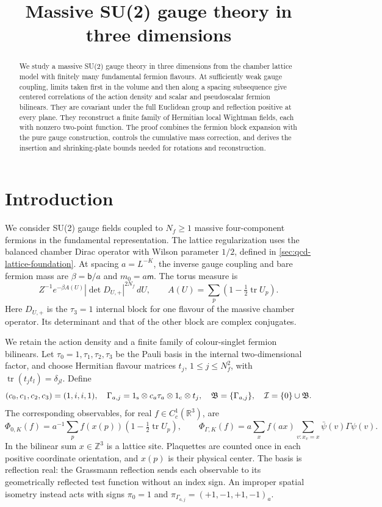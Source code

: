 \documentclass[11pt,letterpaper,reqno]{amsart}
\title[Massive SU(2) gauge theory]{Massive SU(2) gauge theory in three dimensions}
\date{}
\theoremstyle{definition}
\theoremstyle{remark}
\begin{document}
\begin{abstract}
We study a massive SU(2) gauge theory in three dimensions from
the chamber lattice model with finitely many fundamental fermion
flavours. At sufficiently weak gauge coupling, limits taken first
in the volume and then along a spacing subsequence give centered
correlations of the action density and scalar and pseudoscalar
fermion bilinears. They are covariant under the full Euclidean
group and reflection positive at every plane. They reconstruct
a finite family of Hermitian local Wightman fields, each with
nonzero two-point function. The proof combines the fermion block
expansion with the pure gauge construction, controls the cumulative
mass correction, and derives the insertion and shrinking-plate
bounds needed for rotations and reconstruction.
\end{abstract}
\maketitle
\tableofcontents
\section{Introduction}\label{sec:introduction}

We consider SU(2) gauge fields coupled to $N_f\ge1$ massive
four-component fermions in the fundamental representation.
The lattice regularization uses the balanced chamber Dirac
operator with Wilson parameter $1/2$, defined in
\cref{sec:qcd-lattice-foundation}. At spacing $a=L^{-K}$,
the inverse gauge coupling and bare fermion mass are
$\beta=\mathsf b/a$ and $m_0=a\mathsf m$. The torus measure is
\[
 Z^{-1}e^{-\beta A(U)}|\det D_{U,+}|^{2N_f}\,dU,
 \qquad A(U)=\sum_p(1-\tfrac12\operatorname{tr}U_p).
\]
Here $D_{U,+}$ is the $\tau_3=1$ internal block for one flavour
of the massive chamber operator. Its determinant and that
of the other block are complex conjugates.

We retain the action density and a finite family of colour-singlet
fermion bilinears. Let $\tau_0=1,\tau_1,\tau_2,\tau_3$
be the Pauli basis in the internal two-dimensional factor,
and choose Hermitian flavour matrices $t_j$, $1\le j\le N_f^2$,
with $\operatorname{tr}(t_jt_l)=\delta_{jl}$. Define
\[
 (c_0,c_1,c_2,c_3)=(1,i,i,1),\quad
 \Gamma_{a,j}=1_{\rm s}\otimes c_a\tau_a\otimes1_{\rm c}\otimes t_j,
 \quad \mathfrak B=\{\Gamma_{a,j}\},\quad
 \mathcal I=\{0\}\cup\mathfrak B.
\]
The corresponding observables, for real $f\in C_c^1(\mathbb R^3)$, are
\begin{equation}\label{eq:qcd-physical-observables}
 \Phi_{0,K}(f)=a^{-1}\sum_p f(x(p))
                (1-\tfrac12\operatorname{tr}U_p),\qquad
 \Phi_{\Gamma,K}(f)=a\sum_x f(ax)
                      \sum_{v:x_v=x}\bar\psi(v)\Gamma\psi(v).
\end{equation}
In the bilinear sum $x\in\mathbb Z^3$ is a lattice site.
Plaquettes are counted once in each positive coordinate orientation,
and $x(p)$ is their physical center. The basis is reflection real:
the Grassmann reflection sends each observable to its geometrically
reflected test function without an index sign. An improper spatial
isometry instead acts with signs
$\pi_0=1$ and $\pi_{\Gamma_{a,j}}=(+1,-1,+1,-1)_a$.
\end{document}
